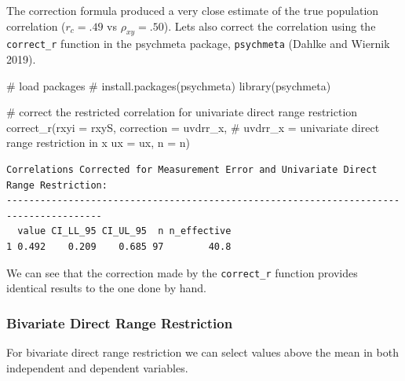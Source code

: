 \documentclass[
  letterpaper,
  DIV=11,
  numbers=noendperiod]{scrreprt}
\newenvironment{Shaded}{\begin{snugshade}}{\end{snugshade}}
\newcommand{\AttributeTok}[1]{\textcolor[rgb]{0.40,0.45,0.13}{#1}}
\newcommand{\CommentTok}[1]{\textcolor[rgb]{0.37,0.37,0.37}{#1}}
\newcommand{\FunctionTok}[1]{\textcolor[rgb]{0.28,0.35,0.67}{#1}}
\newcommand{\NormalTok}[1]{\textcolor[rgb]{0.00,0.23,0.31}{#1}}
\newcommand{\StringTok}[1]{\textcolor[rgb]{0.13,0.47,0.30}{#1}}
\begin{document}
The correction formula produced a very close estimate of the true
population correlation (\(r_c = .49\) vs \(\rho_{xy}=.50\)). Lets also
correct the correlation using the \texttt{correct\_r} function in the
psychmeta package, \texttt{psychmeta} (Dahlke and Wiernik 2019).

\begin{Shaded}
\begin{Highlighting}[]
\CommentTok{\# load packages}
\CommentTok{\# install.packages(\textquotesingle{}psychmeta\textquotesingle{})}
\FunctionTok{library}\NormalTok{(psychmeta)}

\CommentTok{\# correct the restricted correlation for univariate direct range restriction}
\FunctionTok{correct\_r}\NormalTok{(}\AttributeTok{rxyi =}\NormalTok{ rxyS,}
          \AttributeTok{correction =} \StringTok{\textquotesingle{}uvdrr\_x\textquotesingle{}}\NormalTok{,  }\CommentTok{\# uvdrr\_x = univariate direct range restriction in x}
          \AttributeTok{ux =}\NormalTok{ ux,}
          \AttributeTok{n =}\NormalTok{ n)}
\end{Highlighting}
\end{Shaded}

\begin{verbatim}
Correlations Corrected for Measurement Error and Univariate Direct Range Restriction:
---------------------------------------------------------------------------------------
  value CI_LL_95 CI_UL_95  n n_effective
1 0.492    0.209    0.685 97        40.8
\end{verbatim}

We can see that the correction made by the \texttt{correct\_r} function
provides identical results to the one done by hand.

\hypertarget{bivariate-direct-range-restriction-1}{%
\subsubsection{Bivariate Direct Range
Restriction}\label{bivariate-direct-range-restriction-1}}

For bivariate direct range restriction we can select values above the
mean in both independent and dependent variables.
\end{document}
